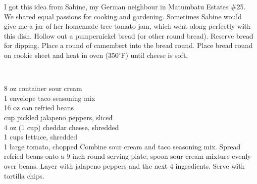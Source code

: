 \begin{minipage}{\linewidth}
\end{minipage}\par\begin{minipage}{\linewidth} 
I got this idea from Sabine, my German neighbour in Matumbatu Estates \#25. We shared equal passions for cooking and gardening. Sometimes Sabine would give me a jar of her homemade tree tomato jam, which went along perfectly with this dish.
Hollow out a pumpernickel bread (or other round bread). Reserve bread for dipping. Place a round of camembert into the bread round. Place bread round on cookie sheet and heat in oven (350$^\circ$F) until cheese is soft.

\end{minipage}\par\begin{minipage}{\linewidth} 
\\

\end{minipage}\par\begin{minipage}{\linewidth}  
	\step
	{8 oz container sour cream		\\
	 1 envelope taco seasoning mix	\\
	 16 oz can refried beans		\\
	  cup pickled jalapeno peppers, sliced	\\
	 4 oz (1 cup) cheddar cheese, shredded		\\
	 1  cups lettuce, shredded	\\
	 1 large tomato, chopped}
	{Combine sour cream and taco seasoning mix. Spread refried beans onto a 9-inch round serving plate; spoon sour cream mixture evenly over beans. Layer with jalapeno peppers and the next 4 ingredients. Serve with tortilla chips.
}


\end{minipage}
